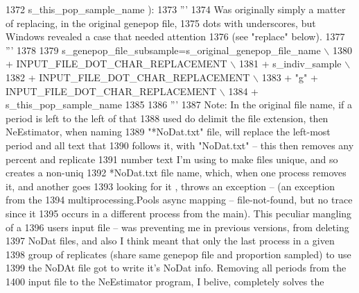 \begin{DoxyCode}
1372                                                     s\_this\_pop\_sample\_name ):
1373     \textcolor{stringliteral}{'''}
1374 \textcolor{stringliteral}{    Was originally simply a matter of replacing, in the original genepop file,}
1375 \textcolor{stringliteral}{    dots with underscores, but Windows revealed a case that needed attention }
1376 \textcolor{stringliteral}{    (see "replace" below).}
1377 \textcolor{stringliteral}{    '''}
1378 
1379     s\_genepop\_file\_subsample=s\_original\_genepop\_file\_name \(\backslash\)
1380                                 + INPUT\_FILE\_DOT\_CHAR\_REPLACEMENT \(\backslash\)
1381                                 +  s\_indiv\_sample \(\backslash\)
1382                                 + INPUT\_FILE\_DOT\_CHAR\_REPLACEMENT \(\backslash\)
1383                                 + \textcolor{stringliteral}{"g"} + INPUT\_FILE\_DOT\_CHAR\_REPLACEMENT \(\backslash\)
1384                                 + s\_this\_pop\_sample\_name
1385     
1386     \textcolor{stringliteral}{'''}
1387 \textcolor{stringliteral}{    Note: In the original file name, if a period is left to the left of that}
1388 \textcolor{stringliteral}{    used do delimit the file extension, then NeEstimator, when naming}
1389 \textcolor{stringliteral}{    "*NoDat.txt" file, will replace the left-most period and all text that}
1390 \textcolor{stringliteral}{    follows it,  with "NoDat.txt" -- this then removes any percent and replicate}
1391 \textcolor{stringliteral}{    number text I'm using to make files unique, and so creates a non-uniq}
1392 \textcolor{stringliteral}{    *NoDat.txt file name, which, when one process removes it, and another goes}
1393 \textcolor{stringliteral}{    looking for it , throws an exception -- (an exception from the}
1394 \textcolor{stringliteral}{    multiprocessing.Pools async mapping -- file-not-found, but no trace since it}
1395 \textcolor{stringliteral}{    occurs in a different process from the main).  This peculiar mangling of a}
1396 \textcolor{stringliteral}{    users input file -- was preventing me in previous versions, from deleting}
1397 \textcolor{stringliteral}{    NoDat files, and also I think meant that only the last process in a given}
1398 \textcolor{stringliteral}{    group of replicates (share same genepop file and proportion sampled) to use}
1399 \textcolor{stringliteral}{    the NoDAt file got to write it's NoDat info.  Removing all periods from the}
1400 \textcolor{stringliteral}{    input file to the NeEstimator program, I belive, completely solves the}

\end{DoxyCode}
